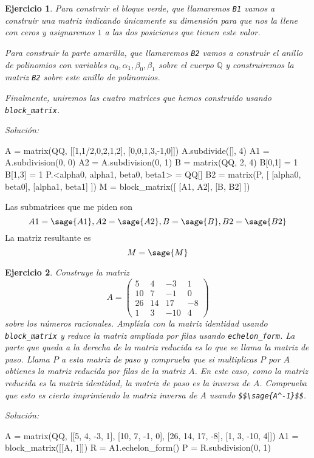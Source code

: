 \documentclass{amsart}
\newtheorem{ejer}{Ejercicio}
\begin{document}
\begin{ejer}
Para construir el bloque verde, que llamaremos \verb|B1| vamos a construir una
matriz indicando únicamente su dimensión para que nos la llene con ceros y asignaremos
$1$ a las dos posiciones que tienen este valor.

Para construir la parte amarilla, que llamaremos \verb|B2| vamos a construir
el anillo de polinomios con variables $\alpha_0,\alpha_1,\beta_0,\beta_1$ sobre
el cuerpo ${\mathbb Q}$ y construiremos la matriz \verb|B2| sobre este anillo
de polinomios.

Finalmente, uniremos las cuatro matrices que hemos construido usando 
\verb|block_matrix|.
\end{ejer}
{\it Solución: }

\begin{sageblock}
A = matrix(QQ, [[1,1/2,0,2,1,2], [0,0,1,3,-1,0]])
A.subdivide([], 4)
A1 = A.subdivision(0, 0)
A2 = A.subdivision(0, 1)
B = matrix(QQ, 2, 4)
B[0,1] = 1
B[1,3] = 1
P.<alpha0, alpha1, beta0, beta1> = QQ[]
B2 = matrix(P, [ [alpha0, beta0], [alpha1, beta1] ])
M = block_matrix([ [A1, A2], [B, B2] ])
\end{sageblock}

Las submatrices que me piden son
$$ A1 = \sage{A1}, A2 = \sage{A2}, B = \sage{B}, B2 = \sage{B2} $$
La matriz resultante es 
$$ M = \sage{M} $$

\begin{ejer}
Construye la matriz 
$$
A = \left(\begin{array}{rrrr}
5 & 4 & -3 & 1 \\
10 & 7 & -1 & 0 \\
26 & 14 & 17 & -8 \\
1 & 3 & -10 & 4
\end{array}\right)
$$
sobre los números racionales. Amplíala con la matriz identidad usando \verb|block_matrix|
y reduce la matriz ampliada por filas usando \verb|echelon_form|. La parte que 
queda a la derecha de la matriz reducida es lo que se llama la matriz de paso. 
Llama $P$ a esta matriz de paso y comprueba que si multiplicas $P$ por $A$ obtienes
la matriz reducida por filas de la matriz $A$. En este caso, como la matriz
reducida es la matriz identidad, la matriz de paso es la inversa de $A$. 
Comprueba que esto es cierto imprimiendo la matriz inversa de $A$ usando
\verb|$$\sage{A^-1}$$|.
\end{ejer}
{\it Solución: }

\begin{sageblock}
A = matrix(QQ, [[5, 4, -3, 1], [10, 7, -1, 0], [26, 14, 17, -8], [1, 3, -10, 4]])
A1 = block_matrix([[A, 1]])
R = A1.echelon_form()
P = R.subdivision(0, 1)
\end{sageblock}
\end{document}
